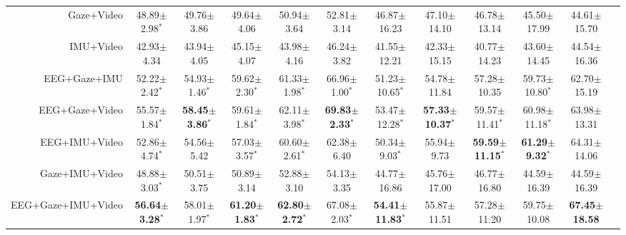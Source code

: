\documentclass[journal]{IEEEtran}
\begin{document}
\begin{table}[t]
{\begin{tabular}{rccccccccccc}
Gaze+Video & 48.89$\pm$2.98$^*$ & 49.76$\pm$3.86 & 49.64$\pm$4.06 & 50.94$\pm$3.64 & 52.81$\pm$3.14 & 46.87$\pm$16.23 & 47.10$\pm$14.10 & 46.78$\pm$13.14 & 45.50$\pm$17.99 & 44.61$\pm$15.70 \\
IMU+Video & 42.93$\pm$4.34 & 43.94$\pm$4.05 & 45.15$\pm$4.07 & 43.98$\pm$4.16 & 46.24$\pm$3.82 & 41.55$\pm$12.21 & 42.33$\pm$15.15 & 40.77$\pm$14.23 & 43.60$\pm$14.45 & 44.54$\pm$16.36 \\
\midrule
EEG+Gaze+IMU & 52.22$\pm$2.42$^*$ & 54.93$\pm$1.46$^*$ & 59.62$\pm$2.30$^*$ & 61.33$\pm$1.98$^*$ & 66.96$\pm$1.00$^*$ & 51.23$\pm$10.65$^*$ & 54.78$\pm$11.84 & 57.28$\pm$10.35 & 59.73$\pm$10.80$^*$ & 62.70$\pm$15.19 \\
EEG+Gaze+Video & 55.57$\pm$1.84$^*$ & \textbf{58.45$\pm$3.86}$^*$ & 59.61$\pm$1.84$^*$ & 62.11$\pm$3.98$^*$ & \textbf{69.83$\pm$2.33}$^*$ & 53.47$\pm$12.28$^*$ & \textbf{57.33$\pm$10.37}$^*$ & 59.57$\pm$11.41$^*$ & 60.98$\pm$11.18$^*$ & 63.98$\pm$13.31 \\
EEG+IMU+Video & 52.86$\pm$4.74$^*$ & 54.56$\pm$5.42 & 57.03$\pm$3.57$^*$ & 60.60$\pm$2.61$^*$ & 62.38$\pm$6.40 & 50.34$\pm$9.03$^*$ & 55.94$\pm$9.73 & \textbf{59.59$\pm$11.15}$^*$ & \textbf{61.29$\pm$9.32}$^*$ & 64.31$\pm$14.06 \\
Gaze+IMU+Video & 48.88$\pm$3.03$^*$ & 50.51$\pm$3.75 & 50.89$\pm$3.14 & 52.88$\pm$3.10 & 54.13$\pm$3.35 & 44.77$\pm$16.86 & 45.76$\pm$17.00 & 46.77$\pm$16.80 & 44.59$\pm$16.39 & 44.59$\pm$16.39 \\
\midrule
EEG+Gaze+IMU+Video & \textbf{56.64$\pm$3.28}$^*$ & 58.01$\pm$1.97$^*$ & \textbf{61.20$\pm$1.83}$^*$ & \textbf{62.80$\pm$2.72}$^*$ & 67.08$\pm$2.03$^*$ & \textbf{54.41$\pm$11.83}$^*$ & 55.87$\pm$11.51 & 57.28$\pm$11.20 & 59.75$\pm$10.08 & \textbf{67.45$\pm$18.58} \\
\bottomrule
\end{tabular}}
\end{table}
\end{document}
